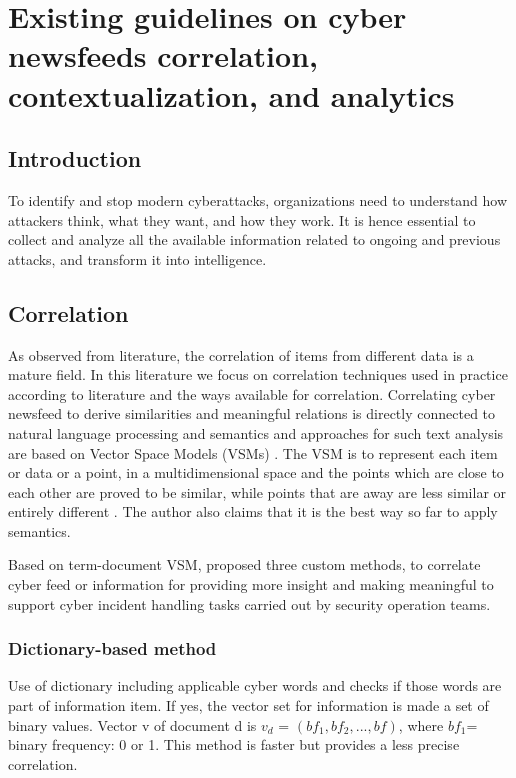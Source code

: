 
 \FloatBarrier
\section{Existing guidelines on cyber newsfeeds correlation, contextualization, and analytics}

\subsection{Introduction}
To identify and stop modern cyberattacks, 
organizations need to understand how attackers think, what they want, 
and how they work. 
It is hence essential to collect and analyze all the available information related to ongoing and previous attacks, 
and transform it into intelligence. 

\subsection{Correlation}
As observed from literature, the correlation of items from different data is a mature field. In this literature we focus on correlation techniques used in practice according to literature and the ways available for correlation. Correlating cyber newsfeed to derive similarities and meaningful relations is directly connected to natural language processing and semantics and approaches for such text analysis are based on Vector Space Models (VSMs) 
\citep{settanni2016correlating}. 
The VSM is to represent each item or data or a point, in a multidimensional space and the points which are close to each other are proved to be similar, while points that are away are less similar or entirely different 
\citep{turney2010frequency}. 
The author also claims that it is the best way so far to apply semantics.

Based on term-document VSM, \cite{settanni2017acquiring} 
proposed three custom methods, 
to correlate cyber feed or information for providing more insight and making meaningful to support cyber incident handling tasks carried out by security operation teams.

\subsubsection{Dictionary-based method}
Use of dictionary including applicable cyber words and checks if those words are part of information item.
If yes, the vector set for information is made a set of binary values.
Vector v of document d is $v_d$ = $(bf_1, bf_2, ..., bf)$, where $bf_1$= binary frequency: 0 or 1. 
This method is faster but provides a less precise correlation.

